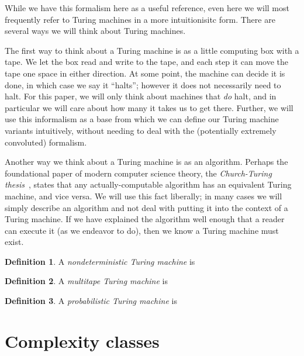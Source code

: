 \documentclass[english,12pt]{reedthesis}
\theoremstyle{plain}
\theoremstyle{definition}
\newtheorem{defn}[defn]{Definition}
\theoremstyle{remark}
\begin{document}
While we have this formalism here as a useful reference, even here we will most
frequently refer to Turing machines in a more intuitionisitc form. There are
several ways we will think about Turing machines.

The first way to think about a Turing machine is as a little computing box with
a tape. We let the box read and write to the tape, and each step it can move the
tape one space in either direction. At some point, the machine can decide it is
done, in which case we say it ``halts''; however it does not necessarily need to
halt. For this paper, we will only think about machines that \emph{do} halt, and
in particular we will care about how many it takes us to get there. Further, we
will use this informalism as a base from which we can define our Turing machine
variants intuitively, without needing to deal with the (potentially extremely
convoluted) formalism.

Another way we think about a Turing machine is as an algorithm. Perhaps the
foundational paper of modern computer science theory, the \emph{Church-Turing
  thesis}~\cite{Tur36}, states that any actually-computable algorithm has an
equivalent Turing machine, and vice versa. We will use this fact liberally; in
many cases we will simply describe an algorithm and not deal with putting it
into the context of a Turing machine. If we have explained the algorithm well
enough that a reader can execute it (as we endeavor to do), then we know a
Turing machine must exist.

\begin{defn}\label{def:nondeterministic-tm}
  A \emph{nondeterministic Turing machine} is %
\end{defn}

\begin{defn}\label{def:multitape-tm}
  A \emph{multitape Turing machine} is
\end{defn}

\begin{defn}\label{def:prob-tm}
  A \emph{probabilistic Turing machine} is
\end{defn}

\section{Complexity classes}

\end{document}
